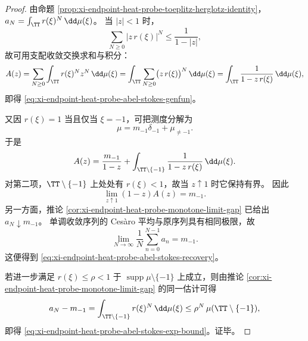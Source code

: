 \begin{proof}
由命题 \ref{prop:xi-endpoint-heat-probe-toeplitz-herglotz-identity}，
\(
a_N=\int_{\TT}r(\xi)^N\,\dd\mu(\xi)
\)。
当 \(|z|<1\) 时，
\[
\sum_{N\ge 0}|z\,r(\xi)|^N\le \frac{1}{1-|z|},
\]
故可用支配收敛交换求和与积分：
\[
A(z)
=
\sum_{N\ge 0}\int_{\TT}r(\xi)^N z^N\,\dd\mu(\xi)
=
\int_{\TT}\sum_{N\ge 0}\bigl(z\,r(\xi)\bigr)^N\,\dd\mu(\xi)
=
\int_{\TT}\frac{1}{1-z\,r(\xi)}\,\dd\mu(\xi),
\]
即得 \eqref{eq:xi-endpoint-heat-probe-abel-stokes-genfun}。

又因 \(r(\xi)=1\) 当且仅当 \(\xi=-1\)，可把测度分解为
\[
\mu=m_{-1}\delta_{-1}+\mu_{\neq -1}.
\]
于是
\[
A(z)
=
\frac{m_{-1}}{1-z}
+
\int_{\TT\setminus\{-1\}}\frac{1}{1-z\,r(\xi)}\,\dd\mu(\xi).
\]
对第二项，\(\TT\setminus\{-1\}\) 上处处有 \(r(\xi)<1\)，故当 \(z\uparrow 1\) 时它保持有界。
因此
\[
\lim_{z\uparrow 1}(1-z)A(z)=m_{-1}.
\]
另一方面，推论 \ref{cor:xi-endpoint-heat-probe-monotone-limit-gap} 已给出 \(a_N\downarrow m_{-1}\)。
单调收敛序列的 Ces\`aro 平均与原序列具有相同极限，故
\[
\lim_{N\to\infty}\frac1N\sum_{n=0}^{N-1}a_n=m_{-1}.
\]
这便得到 \eqref{eq:xi-endpoint-heat-probe-abel-stokes-recovery}。

若进一步满足 \(r(\xi)\le \rho<1\) 于 \(\operatorname{supp}\mu\setminus\{-1\}\) 上成立，则由推论
\ref{cor:xi-endpoint-heat-probe-monotone-limit-gap} 的同一估计可得
\[
a_N-m_{-1}
=
\int_{\TT\setminus\{-1\}}r(\xi)^N\,\dd\mu(\xi)
\le
\rho^N\,\mu(\TT\setminus\{-1\}),
\]
即得 \eqref{eq:xi-endpoint-heat-probe-abel-stokes-exp-bound}。证毕。
\end{proof}
